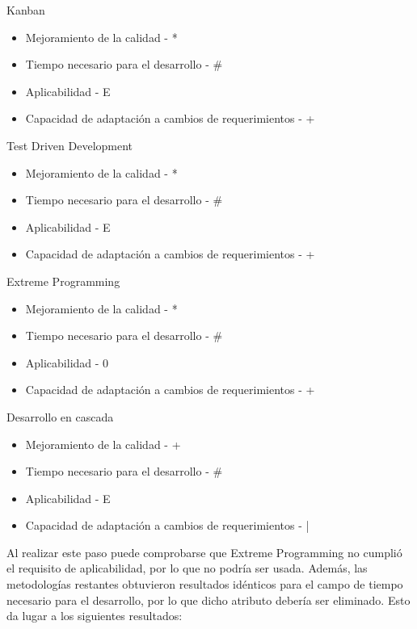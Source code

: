 \documentclass{article}
\begin{document}
Kanban
\begin{itemize}
    \item Mejoramiento de la calidad - *
    \item Tiempo necesario para el desarrollo - \#
    \item Aplicabilidad - E
    \item Capacidad de adaptación a cambios de requerimientos - +
\end{itemize}
Test Driven Development
\begin{itemize}
    \item Mejoramiento de la calidad - *
    \item Tiempo necesario para el desarrollo - \#
    \item Aplicabilidad - E
    \item Capacidad de adaptación a cambios de requerimientos - +
\end{itemize}
Extreme Programming
\begin{itemize}
    \item Mejoramiento de la calidad - *
    \item Tiempo necesario para el desarrollo - \#
    \item Aplicabilidad - 0
    \item Capacidad de adaptación a cambios de requerimientos - +
\end{itemize}
Desarrollo en cascada
\begin{itemize}
    \item Mejoramiento de la calidad - +
    \item Tiempo necesario para el desarrollo - \#
    \item Aplicabilidad - E
    \item Capacidad de adaptación a cambios de requerimientos - |
\end{itemize}
Al realizar este paso puede comprobarse que Extreme Programming no cumplió el requisito de aplicabilidad, por lo que no podría ser usada. Además, las metodologías restantes obtuvieron resultados idénticos para el campo de tiempo necesario para el desarrollo, por lo que dicho atributo debería ser eliminado. Esto da lugar a los siguientes resultados:
\end{document}
